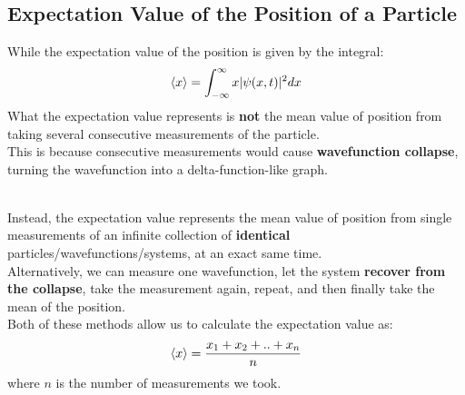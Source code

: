 \documentclass[hidelinks, a4paper, 12pt]{article}
\newcommand{\bd}{\textbf}
\newcommand{\n}{\\[\baselineskip]}
\begin{document}
        \subsection{Expectation Value of the Position of a Particle}
            While the expectation value of the position is given by the integral:
            \begin{equation}
                \braket{x} = \int_{-\infty}^{\infty} x|\psi(x,t)|^2dx
            \end{equation}
            What the expectation value represents is \bd{not} the mean value of position from taking several consecutive measurements of the particle.\n
            This is because consecutive measurements would cause \bd{wavefunction collapse}, turning the wavefunction into a delta-function-like graph.\n
            \n
            Instead, the expectation value represents the mean value of position from single measurements of an infinite collection of \bd{identical} particles/wavefunctions/systems, at an exact same time.\n
            Alternatively, we can measure one wavefunction, let the system \bd{recover from the collapse}, take the measurement again, repeat, and then finally take the mean of the position.\n
            Both of these methods allow us to calculate the expectation value as:
            \[\braket{x} = \frac{x_1 + x_2 + .. + x_n}{n}\]
            where $n$ is the number of measurements we took.
\end{document}
